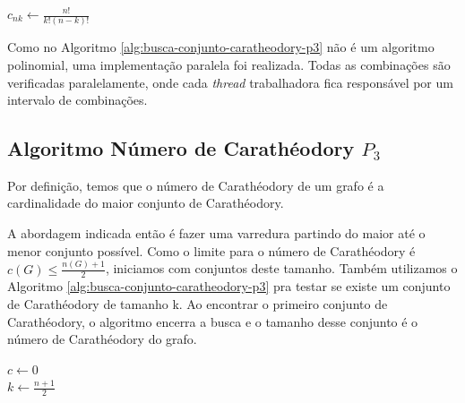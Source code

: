 \begin{algorithm2e}
    \SetAlFnt{\tiny}
    \SetAlCapFnt{\small}
    \SetAlCapNameFnt{\small}
    \SetAlgoLined
    \DontPrintSemicolon
    \LinesNumbered
    \SetAlgoLined
    \BlankLine
    \BlankLine
    $c_{nk} \gets \frac{n!}{k!(n-k)!}$\\
\caption{$ConjuntoCaratheodoryK(G(V,E),k)$}
\label{alg:busca-conjunto-caratheodory-p3}
\end{algorithm2e}

Como no Algoritmo \ref{alg:busca-conjunto-caratheodory-p3} não é um algoritmo polinomial,
uma implementação paralela foi realizada.
Todas as combinações são verificadas paralelamente,
onde cada \textit{thread} trabalhadora fica responsável
por um intervalo de combinações.

\subsection{Algoritmo Número de Carathéodory $P_3$}
Por definição, temos que o número de Carathéodory de um grafo 
é a cardinalidade do maior conjunto de Carathéodory.

A abordagem indicada então é fazer uma varredura partindo do maior até o menor conjunto possível.
Como o limite para o número de Carathéodory é $c(G) \le \frac{n(G) + 1}{2}$,
iniciamos com conjuntos deste tamanho. Também utilizamos o Algoritmo \ref{alg:busca-conjunto-caratheodory-p3}
pra testar se existe um conjunto de Carathéodory de tamanho k.
Ao encontrar o primeiro conjunto de Carathéodory, o algoritmo encerra a busca 
e o tamanho desse conjunto é o número de Carathéodory do grafo.

\begin{algorithm2e}
   \SetAlFnt{\tiny}
    \SetAlCapFnt{\small}
    \SetAlCapNameFnt{\small}
    \SetAlgoLined
    \DontPrintSemicolon
    \LinesNumbered
    \SetAlgoLined
    \BlankLine
    \BlankLine
    $c \gets 0$\\
    $k \gets \frac{n + 1}{2}$\\
\caption{$NumeroCaratheodory(G(V,E))$}
\label{alg:numero-caratheodory-p3}
\end{algorithm2e}

